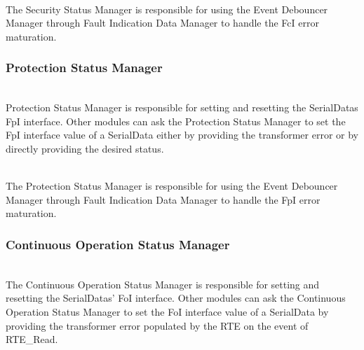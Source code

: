 \\
The Security Status Manager is responsible for using the Event Debouncer Manager through Fault Indication Data Manager 
to handle the FcI error maturation. 
\\
{    }


\subsubsection{Protection Status Manager}
\\
Protection Status Manager is responsible for setting and resetting the SerialDatas FpI interface.
Other modules can ask the Protection Status Manager to set the FpI interface value of a SerialData either by providing the transformer error or by directly providing the desired status.

{  }

\\
The Protection Status Manager is responsible for using the Event Debouncer Manager through Fault Indication Data Manager 
to handle the FpI error maturation.
\\
{    }


\subsubsection{Continuous Operation Status Manager}
\\
The Continuous Operation Status Manager is responsible for setting and resetting the SerialDatas' FoI interface. 
Other modules can ask the Continuous Operation Status Manager to set the FoI interface value of a SerialData by providing the transformer error populated by the RTE on the event of RTE_Read.

{ }

